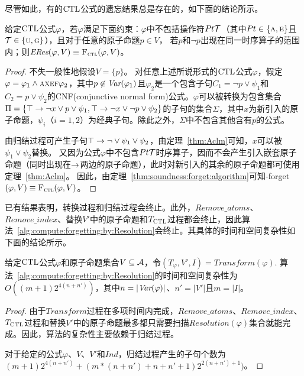 尽管如此，有的$\textrm{CTL}$公式的遗忘结果总是存在的，如下面的结论所示。
\begin{proposition} \label{pro:fogCTL}
给定$\textrm{CTL}$公式$\varphi$，若$\varphi$满足下面约束：$\varphi$中不包括操作符$Pt {\cal T}$（其中$Pt \in \{\textsc{a}, \textsc{e}\}$且${\cal T} \in \{\textsc{u}, \textsc{g}\}$），且对于任意的原子命题$p\in V$， 若$p$和$\neg p$出现在同一时序算子的范围内；则$\emph{ERes}(\varphi,V) \equiv {\textsc{F}_{\textsc{ctl}}}(\varphi, V)$。
\end{proposition}
\begin{proof}
	不失一般性地假设$V = \{p\}$。
	对任意上述所说形式的$\textrm{CTL}$公式$\varphi$，假定$\varphi = \varphi_1 \wedge \textsc{a} \textsc{x} \textsc{e} \textsc{f} \varphi_2$，其中$p\not \in \textit{Var}(\varphi_1)$且$\varphi_2$是一个包含子句$C_1 = \neg p \vee \psi_1$和$C_2 = p \vee \psi_2$的CNF(conjunctive normal form)公式。$\varphi$可以被转换为包含集合$\Pi = \{\top \rightarrow \neg x \vee p \vee  \psi_1,  \top \rightarrow \neg x \vee \neg p \vee \psi_2\}$的子句的集合$\Sigma$，其中$x$为新引入的原子命题，$\psi_i$（$i=1,2$）为经典子句。除此之外，$\Sigma$中不包含其他含有$p$的公式。
	
	由归结过程可产生子句$\top \rightarrow \neg \vee \psi_1 \vee \psi_2$，由定理~\ref{thm:Aclm}可知，$x$可以被$\psi_1 \vee \psi_2$替换。
	又因为公式$\varphi$中不包含$Pt {\cal T}$时序算子，因而不会产生引入嵌套原子命题（同时出现在$\rightarrow$两边的原子命题），此时对新引入的其余的原子命题都可使用定理~\ref{thm:Aclm}。
	因此，由定理~\ref{thm:soundness:forget:algorithm}可知\CTL-forget$(\varphi,V)\equiv {\textsc{F}_{\textsc{ctl}}}(\varphi, V)$。
\end{proof}




\label{chp4:sect:complex}
已有结果表明，转换过程和归结过程会终止\cite{zhang2014resolution}。此外，$Remove\_atoms$、$Remove\_index$、替换$V'$中的原子命题和$T_{\textrm{CTL}}$过程都会终止，因此算法~\ref{alg:compute:forgetting:by:Resolution}会终止。其具体的时间和空间复杂性如下面的结论所示。


\begin{proposition}\label{pro:complexity}
	给定$\textrm{CTL}$公式$\varphi$和原子命题集合$V \subseteq {\cal A}$，令$(T_{\varphi}, V', I)=Transform(\varphi)$.
	算法~\ref{alg:compute:forgetting:by:Resolution}的时间和空间复杂性为$O((m+1)2^{4(n+n')})$，其中$n=|\textit{Var}(\varphi)|$、$n'=|V'|$且$m=|I|$。
\end{proposition}
\begin{proof}
	由于$Transform$过程在多项时间内完成，$Remove\_atoms$、$Remove\_index$、$T_{\textrm{CTL}}$过程和替换$V'$中的原子命题最多都只需要扫描$Resolution(\varphi)$集合就能完成。因此，算法的复杂性主要依赖于归结过程。
	
	对于给定的公式$\varphi$、$V$、$V'$和$Ind$，归结过程产生的子句个数为$(m+1)2^{4(n+n')}+(m*(n+n')+n+n'+1)2^{2(n+n')+1})$。
\end{proof}

